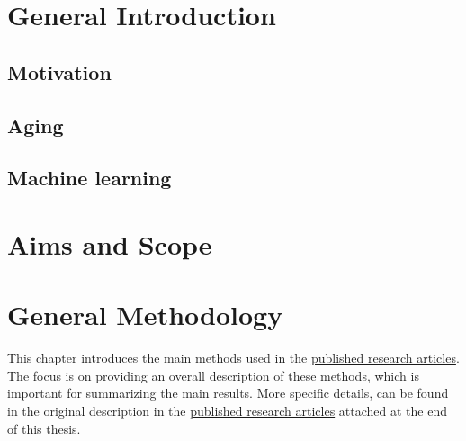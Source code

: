 \documentclass[oneside]{book}
\begin{document}
    \tableofcontents
    
    \listoffigures
    
    \listoftables

    \printglossary[nonumberlist, type=\acronymtype, title={List of Abbreviations}]
    

    \glsresetall
    \chapter{General Introduction}\label{chap:intro}
    
        \section{Motivation}
        \label{motivation}
        
        
    
        \section{Aging}
        \label{theory:aging}
            
        
        \section{Machine learning}
        \label{theory:ml}
         

    \chapter{Aims and Scope}
    \label{chap:aims_scope}
    

    \chapter{General Methodology}
    \label{chap:methods}
    This chapter introduces the main methods used in the \hyperref[pub:papers]{published research articles}. The focus is on providing an overall description of these methods, which is important for summarizing the main results. More specific details, can be found in the original description in the \hyperref[pub:papers]{published research articles} attached at the end of this thesis.
    
\end{document}
